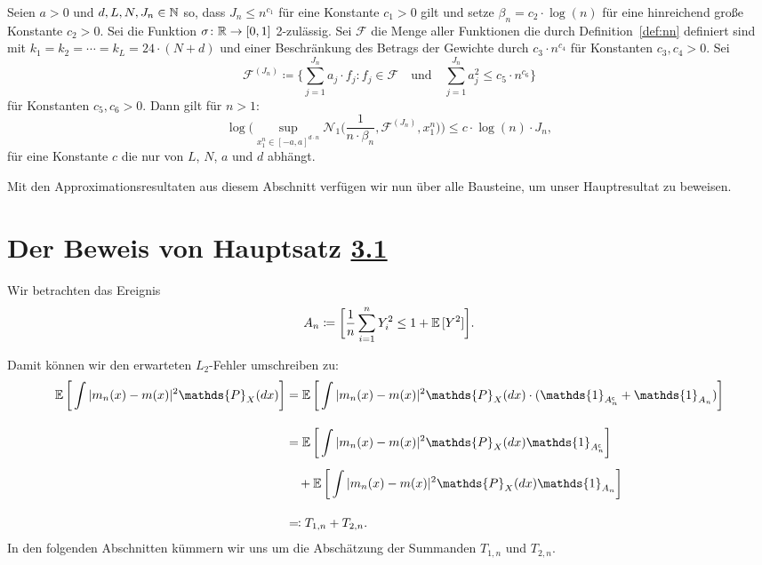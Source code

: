 \begin{lem}
\label{lem:9}
Seien $a > 0$ und $d, L, N, J_n \in \mathbb{N}$ so, dass $J_n \leq n^{c_{1}}$ für eine Konstante $c_1 > 0$ gilt und setze $\beta_n = c_2 \cdot \log(n)$ für eine hinreichend große Konstante $c_2 > 0.$ 
Sei die Funktion $\sigma\colon \mathbb{R} \to [0, 1]$ 2-zulässig. Sei $\mathcal{F}$ die Menge aller Funktionen die durch Definition~\ref{def:nn} definiert sind mit $k_1 = k_2 = \cdots = k_L = 24 \cdot (N + d)$ und einer Beschränkung des Betrags der Gewichte durch $c_{3} \cdot n^{c_{4}}$ für Konstanten $c_3, c_4 > 0$. Sei
$$ \mathcal{F}^{(J_n)} \coloneqq \biggl\{\sum_{j = 1}^{J_n} a_j \cdot f_j : f_j \in \mathcal{F} \quad \text{und} \quad \sum_{j = 1}^{J_n} a_j^2 \leq c_{5} \cdot n^{c_{6}}\biggr\}$$ für Konstanten $c_5, c_6 > 0.$
Dann gilt für $n > 1$:
$$\log\bigg(\sup_{x_1^n\in[-a,a]^{d \cdot n}} \mathcal{N}_1\Big(\frac{1}{n \cdot \beta_n}, \mathcal{F}^{(J_n)},x_1^n\Big)\bigg) \leq c \cdot \log(n) \cdot J_n,$$
für eine Konstante $c$ die nur von $L$, $N$, $a$ und $d$ abhängt.
\end{lem}

Mit den Approximationsresultaten aus diesem Abschnitt verfügen wir nun über alle Bausteine, um unser Hauptresultat zu beweisen.

\section{Der Beweis von Hauptsatz \hyperref[optstop]{3.1}}

Wir betrachten das Ereignis 
\begin{equation}
\label{event}
A_n \coloneqq \bigg[\frac{1}{n} \sum_{i = 1}^n Y_i^2 \leq 1 + \mathbb{E}\,[Y^2]\bigg].
\end{equation}

Damit können wir den erwarteten $L_2$-Fehler umschreiben zu:
\begin{equation}
\label{originaleq}
\begin{split}
\E \bigg[\int |m_n(x) - m(x)|^2 \mathds{P}_X(dx)\bigg] & = \E \bigg[\int |m_n(x) - m(x)|^2 \mathds{P}_X(dx) \cdot (\mathds{1}_{A_n^{\mathsf{c}}} + \mathds{1}_{A_n})\bigg] \\[1em]
& = \E \bigg[\int |m_n(x) - m(x)|^2 \mathds{P}_X(dx) \mathds{1}_{A_n^{\mathsf{c}}}\bigg] \\[0.5em]
& \quad + \E \bigg[\int |m_n(x) - m(x)|^2 \mathds{P}_X(dx) \mathds{1}_{A_n}\bigg] \\[1em] 
& \eqqcolon T_{1,n} + T_{2,n}.
\end{split}
\end{equation}
In den folgenden Abschnitten kümmern wir uns um die Abschätzung der Summanden $T_{1,n}$ und $T_{2,n}$.

